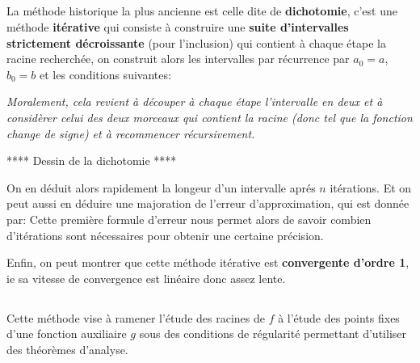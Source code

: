 \subsection*{}
La méthode historique la plus ancienne est celle dite de \textbf{dichotomie}, c'est une méthode \textbf{itérative} qui consiste à construire une \textbf{suite d'intervalles strictement décroissante} (pour l'inclusion) qui contient à chaque étape la racine recherchée, on construit alors les intervalles par récurrence par \(a_0 = a\), \(b_0 = b\) et les conditions suivantes:
\begin{center}
   \textit{Moralement, cela revient à découper à chaque étape l'intervalle en deux et à considèrer celui des deux morceaux qui contient la racine (donc tel que la fonction change de signe) et à recommencer récursivement.}
\end{center}
\begin{center}
   **** Dessin de la dichotomie ****
\end{center}

On en déduit alors rapidement la longeur d'un intervalle aprés \(n\) itérations. Et on peut aussi en déduire une majoration de l'erreur d'approximation, qui est donnée par:
Cette première formule d'erreur nous permet alors de savoir combien d'itérations sont nécessaires pour obtenir une certaine précision.\<

Enfin, on peut montrer que cette méthode itérative est \textbf{convergente d'ordre 1}, ie sa vitesse de convergence est linéaire donc assez lente.

\subsection*{}
Cette méthode vise à ramener l'étude des racines de \(f\) à l'étude des points fixes d'une fonction auxiliaire \(g\) sous des conditions de régularité permettant d'utiliser des théorèmes d'analyse.\<

